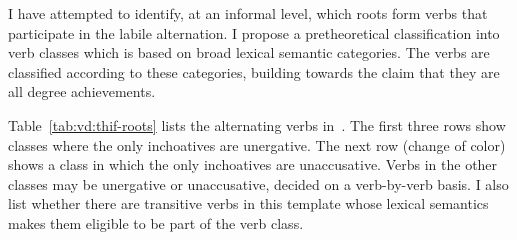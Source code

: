 I have attempted to identify, at an informal level, which roots form verbs that participate in the labile alternation. I propose a pretheoretical classification into verb classes which is based on broad lexical semantic categories. The verbs are classified according to these categories, building towards the claim that they are all degree achievements.

Table~\ref{tab:vd:thif-roots} lists the alternating verbs in~{\thif}. The first three rows show classes where the only inchoatives are unergative. The next row (change of color) shows a class in which the only inchoatives are unaccusative. Verbs in the other classes may be unergative or unaccusative, decided on a verb-by-verb basis. I also list whether there are transitive verbs in this template whose lexical semantics makes them eligible to be part of the verb class.

